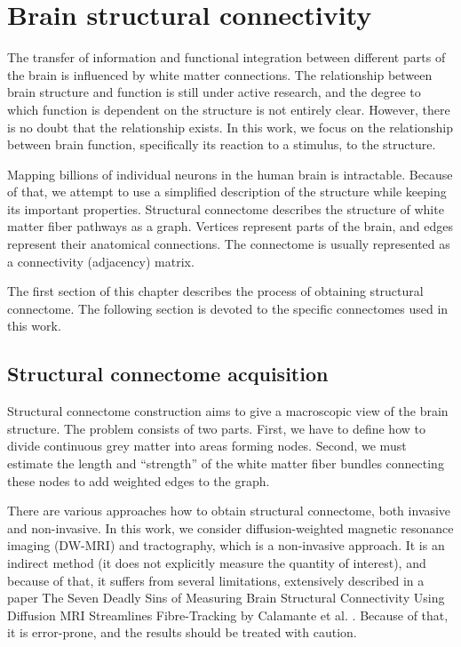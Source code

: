 \chapter{Brain structural connectivity}

The transfer of information and functional integration between different parts of the brain is influenced by white matter connections. The relationship between brain structure and function is still under active research, and the degree to which function is dependent on the structure is not entirely clear. However, there is no doubt that the relationship exists.  In this work, we focus on the relationship between brain function, specifically its reaction to a stimulus, to the structure. 

Mapping billions of individual neurons in the human brain is intractable. Because of that, we attempt to use a simplified description of the structure while keeping its important properties. Structural connectome describes the structure of white matter fiber pathways as a graph. Vertices represent parts of the brain, and edges represent their anatomical connections. The connectome is usually represented as a connectivity (adjacency) matrix. \cite{yeh_mapping_2021}

The first section of this chapter describes the process of obtaining structural connectome. The following section is devoted to the specific connectomes used in this work.

\section{Structural connectome acquisition}


Structural connectome construction aims to give a macroscopic view of the brain structure. The problem consists of two parts. First, we have to define how to divide continuous grey matter into areas forming nodes. Second, we must estimate the length and \enquote{strength} of the white matter fiber bundles connecting these nodes to add weighted edges to the graph.

There are various approaches how to obtain structural connectome, both invasive and non-invasive. In this work, we consider diffusion-weighted magnetic resonance imaging (DW-MRI) and tractography, which is a non-invasive approach. It is an indirect method (it does not explicitly measure the quantity of interest), and because of that, it suffers from several limitations, extensively described in a paper The Seven Deadly Sins of Measuring Brain Structural Connectivity Using Diffusion MRI Streamlines Fibre-Tracking by Calamante et al. \cite{calamante_seven_2019}. Because of that, it is error-prone, and the results should be treated with caution. \cite{sotiropoulos_building_2019}

